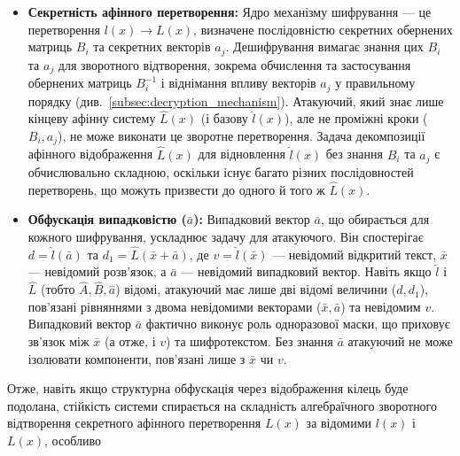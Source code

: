 \begin{itemize}
    \item \textbf{Секретність афінного перетворення:} Ядро механізму шифрування — це перетворення $l(x) \to L(x)$, визначене послідовністю секретних обернених матриць $B_i$ та секретних векторів $a_j$.
    Дешифрування вимагає знання цих $B_i$ та $a_j$ для зворотного відтворення, зокрема обчислення та застосування обернених матриць $B_i^{-1}$ і віднімання впливу векторів $a_j$ у правильному порядку (див.~\ref{subsec:decryption_mechanism}). Атакуючий, який знає лише кінцеву афінну систему $\hat{L}(x)$ (і базову $\hat{l}(x)$), але не проміжні кроки ($B_i, a_j$), не може виконати це зворотне перетворення. Задача декомпозиції афінного відображення $\hat{L}(x)$ для відновлення $\hat{l}(x)$ без знання $B_i$ та $a_j$ є обчислювально складною, оскільки існує багато різних послідовностей перетворень, що можуть призвести до одного й того ж $\hat{L}(x)$.
    \item \textbf{Обфускація випадковістю ($\bar{a}$):} Випадковий вектор $\bar{a}$, що обирається для кожного шифрування, ускладнює задачу для атакуючого.
    Він спостерігає $d = \hat{l}(\bar{a})$ та $d_1 = \hat{L}(\bar{x} + \bar{a})$, де $v = \hat{l}(\bar{x})$ — невідомий відкритий текст, $\bar{x}$ — невідомий розв'язок, а $\bar{a}$ — невідомий випадковий вектор.
    Навіть якщо $\hat{l}$ і $\hat{L}$ (тобто $\hat{A}, \hat{B}, \hat{a}$) відомі, атакуючий має лише дві відомі величини ($d, d_1$), пов'язані рівняннями з двома невідомими векторами ($\bar{x}, \bar{a}$) та невідомим $v$.
    Випадковий вектор $\bar{a}$ фактично виконує роль одноразової маски, що приховує зв'язок між $\bar{x}$ (а отже, і $v$) та шифротекстом. Без знання $\bar{a}$ атакуючий не може ізолювати компоненти, пов'язані лише з $\bar{x}$ чи $v$.
\end{itemize}
Отже, навіть якщо структурна обфускація через відображення кілець буде подолана, стійкість системи спирається на складність алгебраїчного зворотного відтворення секретного афінного перетворення $L(x)$ за відомими $l(x)$ і $L(x)$, особливо
